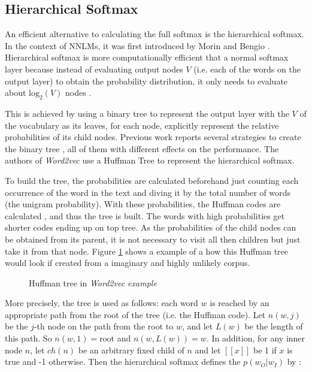 \subsection{Hierarchical Softmax}
\label{sec:sub-hs}


An efficient alternative to calculating the full softmax is the hierarchical
softmax. In the context of \ac{NNLM}s, it was first introduced by Morin and
Bengio \cite{Morin05hierarchicalprobabilistic}. Hierarchical softmax is more
computationally efficient that a normal softmax layer because instead of
evaluating output nodes $V$ (i.e. each of the words on the output layer) to
obtain the probability distribution, it only needs to evaluate about
$\text{log}_2 \left( V \right)$ nodes \cite{MikolovSCCD13}.

This is achieved by  using a binary tree to represent the output layer with
the $V$ of the vocabulary as its leaves, for each node, explicitly represent
the relative probabilities of its child nodes. Previous work reports several
strategies to create the binary tree \cite{Mnih08ascalable}, all of them with
different effects on the performance. The authors of \textit{Word2vec} use a
Huffman Tree  to represent the hierarchical softmax.

To build the tree, the probabilities are calculated beforehand just counting
each occurrence of  the word in the text 
and diving it by the total number of words (the unigram probability).  With these probabilities, the
Huffman codes are calculated \cite{huf52}, and thus the tree is built. The
words with high probabilities get shorter codes ending up on top tree. As the
probabilities of the child nodes can be obtained from its parent,  it is not
necessary to visit all then children but just take it from that node. Figure
\ref{fig:huffam-tree-w2v-example} shows a example of a how this Huffman tree
would look if created from a imaginary and  highly unlikely corpus. 




\begin{figure}[h]
    \centering
    \caption{Huffman tree in \textit{Word2vec example}}
    \label{fig:huffam-tree-w2v-example}
\end{figure}

More precisely, the tree is used as follows: each word $w$ is reached by an
appropriate path from the root of the tree (i.e. the Huffman code). Let
$n(w,j)$ be the $j$-th node on the path from the root to $w$, and let $L(w)$
be the length of this path. So $n(w,1) = \text{root}$ and $n(w,L(w)) = w$. In
addition, for any inner node $n$, let $ch(n)$ be an arbitrary fixed child of
$n$ and let $[\![ x ]\!] $ be 1 if $x$ is true and -1 otherwise. Then the
hierarchical softmax defines the $p(w_O|w_I)$  by \cite{MikolovSCCD13} : 


